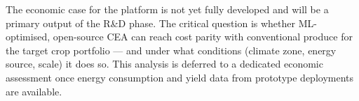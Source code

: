 
The economic case for the platform is not yet fully developed and will be a primary output of the R\&D phase. The critical question is whether ML-optimised, open-source CEA can reach cost parity with conventional produce for the target crop portfolio --- and under what conditions (climate zone, energy source, scale) it does so. This analysis is deferred to a dedicated economic assessment once energy consumption and yield data from prototype deployments are available.
